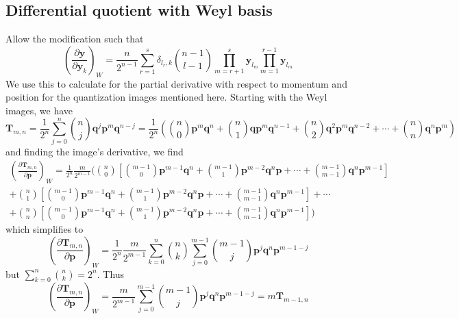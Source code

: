 \documentclass[a4paper]{article}
\theoremstyle{definition}
\begin{document}
\subsection{Differential quotient with Weyl basis}
Allow the modification such that
\begin{equation}
	\left( \frac{\partial\textbf{y}}{\partial\textbf{y}_k}\right)_W=\frac{n}{2^{n-1}}\sum_{r=1}^s\delta_{l_r,k}\binom{n-1}{l-1}\prod_{m=r+1}^s\textbf{y}_{l_m}\prod_{m=1}^{r-1}\textbf{y}_{l_m}
\end{equation}
We use this to calculate for the partial derivative with respect to momentum and position for the quantization images mentioned here. Starting with the Weyl images, we have
\begin{equation}
	\textbf{T}_{m,n}=\frac{1}{2^n}\sum_{j=0}^n\binom{n}{j}\textbf{q}^j\textbf{p}^m\textbf{q}^{n-j}=\frac{1}{2^n}\left(\binom{n}{0}\textbf{p}^m\textbf{q}^n+\binom{n}{1}\textbf{q}\textbf{p}^m\textbf{q}^{n-1}+\binom{n}{2}\textbf{q}^2\textbf{p}^m\textbf{q}^{n-2}+\cdots+\binom{n}{n}\textbf{q}^n\textbf{p}^m\right) 
\end{equation}
and finding the image's derivative, we find
\begin{multline}
	\left( \frac{\partial\textbf{T}_{m,n}}{\partial\textbf{p}}\right)_W=\frac{1}{2^n}\frac{m}{2^{m-1}}\biggl(\binom{n}{0}\left[\binom{m-1}{0}\textbf{p}^{m-1}\textbf{q}^n+\binom{m-1}{1}\textbf{p}^{m-2}\textbf{q}^n\textbf{p}+\cdots+\binom{m-1}{m-1}\textbf{q}^n\textbf{p}^{m-1}\right]\\+\binom{n}{1}\left[\binom{m-1}{0}\textbf{p}^{m-1}\textbf{q}^n+\binom{m-1}{1}\textbf{p}^{m-2}\textbf{q}^n\textbf{p}+\cdots+\binom{m-1}{m-1}\textbf{q}^n\textbf{p}^{m-1}\right]+\cdots\\+\binom{n}{n}\left[\binom{m-1}{0}\textbf{p}^{m-1}\textbf{q}^n+\binom{m-1}{1}\textbf{p}^{m-2}\textbf{q}^n\textbf{p}+\cdots+\binom{m-1}{m-1}\textbf{q}^n\textbf{p}^{m-1}\right]\biggr) 
\end{multline}
which simplifies to
\begin{equation}
	\left( \frac{\partial\textbf{T}_{m,n}}{\partial\textbf{p}}\right)_W=\frac{1}{2^n}\frac{m}{2^{m-1}}\sum_{k=0}^{n}\binom{n}{k}\sum_{j=0}^{m-1}\binom{m-1}{j}\textbf{p}^j\textbf{q}^{n}\textbf{p}^{m-1-j}
\end{equation}
but $\displaystyle\sum_{k=0}^n\binom{n}{k}=2^n$. Thus
\begin{equation}
	\left( \frac{\partial\textbf{T}_{m,n}}{\partial\textbf{p}}\right)_W=\frac{m}{2^{m-1}}\sum_{j=0}^{m-1}\binom{m-1}{j}\textbf{p}^j\textbf{q}^{n}\textbf{p}^{m-1-j}=m\textbf{T}_{m-1,n}
\end{equation}
\end{document}
